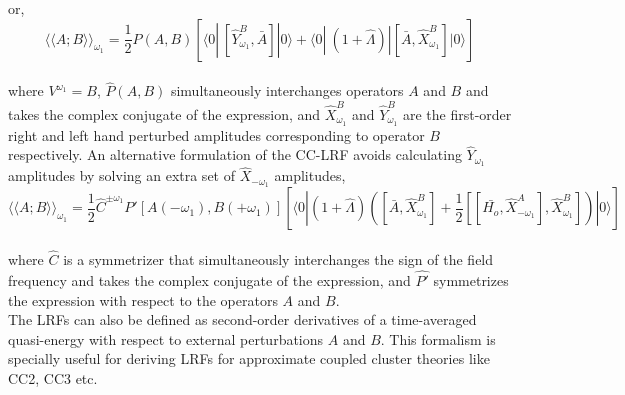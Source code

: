 or,
\begin{equation}
{\langle\langle A;B\rangle\rangle}_{\omega_1} =  \frac{1}{2}\hat{P}(A,B)[\langle 0 | \
[\hat{Y}^{B}_{\omega_1}, \bar{A}]|0\rangle + \langle 0 | \
(1 + \hat{\Lambda})|[\bar{A},\hat{X}^{B}_{\omega_1}]|0\rangle]
\end{equation}
\\
where $V^{\omega_1} = B$, $\hat{P}(A,B)$ simultaneously interchanges operators $A$ and $B$
and takes the complex conjugate of the expression,
and $\hat{X}^{B}_{\omega_1}$ and $\hat{Y}^{B}_{\omega_1}$ are the first-order right 
and left hand perturbed amplitudes corresponding to operator
$B$ respectively. An alternative formulation of the CC-LRF avoids calculating $\hat{Y}_{\omega_1}$
amplitudes by solving an extra set of $\hat{X}_{-\omega_1}$ amplitudes,
\\
\begin{equation}
{\langle\langle A;B \rangle\rangle}_{\omega_1}=
\frac{1}{2}\hat{C}^{\pm\omega_1}\hat{P'}[A(-\omega_1),B(+\omega_1)] \left[
\langle0|(1+\hat{\Lambda})\left( [\bar{A},\hat{X}^B_{\omega_1}] +
\frac{1}{2}[[\bar{H_o},\hat{X}^{A}_{-\omega_1}], \hat{X}^{B}_{\omega_1}]
\right) |0\rangle \right]
\label{Eq:linresp}
\end{equation}
\\
where $\hat{C}$ is a symmetrizer that simultaneously interchanges the sign of the field 
frequency and takes the complex conjugate of the expression, and $\hat{P'}$ symmetrizes 
the expression with respect to the operators $A$ and $B$.\\
The LRFs can also be defined as second-order derivatives
of a time-averaged quasi-energy with respect to external perturbations $A$ and
$B$. This formalism is specially useful for deriving LRFs for approximate
coupled cluster theories like CC2, CC3 etc.





